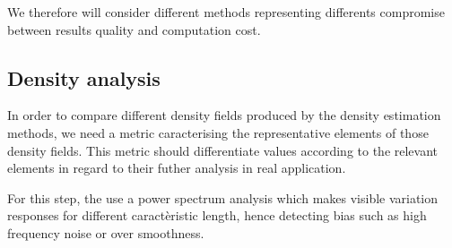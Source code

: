 \documentclass[10pt,a4paper,twoside,twocolumn]{article}
\newcommand*{\rootPath}{../}
\begin{document}
We therefore will consider different methods representing differents compromise
between results quality and computation cost.

\subsection{Density analysis}

In order to compare different density fields produced by the density estimation
methods, we need a metric caracterising the representative elements of those
density fields. This metric should differentiate values according to the
relevant elements in regard to their futher analysis in real application.

For this step, the use a power spectrum analysis which makes visible variation
responses for different caractèristic length, hence detecting bias such as high
frequency noise or over smoothness.

\ifstandalone
	
	
\fi
\end{document}
